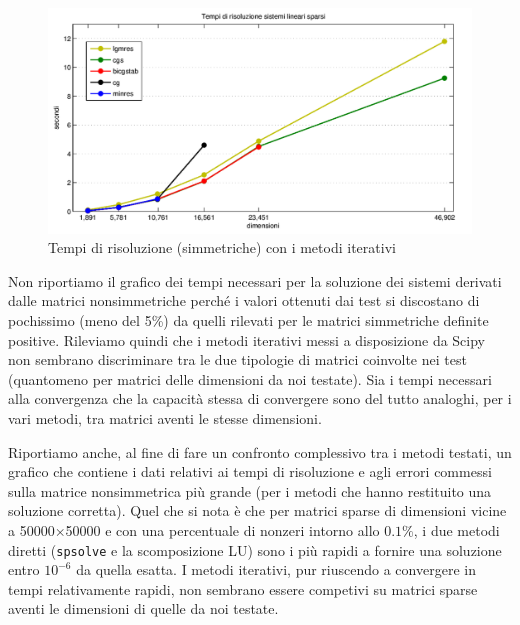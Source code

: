 \documentclass[11pt,a4paper]{scrartcl}
\begin{document}
\begin{figure}[!ht]
\centering
\includegraphics[scale=0.51]{images/tempi_iterativi} 
\caption{Tempi di risoluzione (simmetriche) con i metodi iterativi}
\label{tempi_iterativi}
\end{figure}

Non riportiamo il grafico dei tempi necessari per la soluzione dei sistemi derivati dalle matrici nonsimmetriche perché i valori ottenuti dai test si discostano di pochissimo (meno del 5\%) da quelli rilevati per le matrici simmetriche definite positive. Rileviamo quindi che i metodi iterativi messi a disposizione da Scipy non sembrano discriminare tra le due tipologie di matrici coinvolte nei test (quantomeno per matrici delle dimensioni da noi testate). Sia i tempi necessari alla convergenza che la capacità stessa di convergere sono del tutto analoghi, per i vari metodi, tra matrici aventi le stesse dimensioni.

Riportiamo anche, al fine di fare un confronto complessivo tra i metodi testati, un grafico che contiene i dati relativi ai tempi di risoluzione e agli errori commessi sulla matrice nonsimmetrica più grande (per i metodi che hanno restituito una soluzione corretta). Quel che si nota è che per matrici sparse di dimensioni vicine a 50000$\times$50000 e con una percentuale di nonzeri intorno allo $0.1\%$, i due metodi diretti (\texttt{spsolve} e la scomposizione LU) sono i più rapidi a fornire una soluzione entro $10^{-6}$ da quella esatta. I metodi iterativi, pur riuscendo a convergere in tempi relativamente rapidi, non sembrano essere  competivi su matrici sparse aventi le dimensioni di quelle da noi testate.
\end{document}
